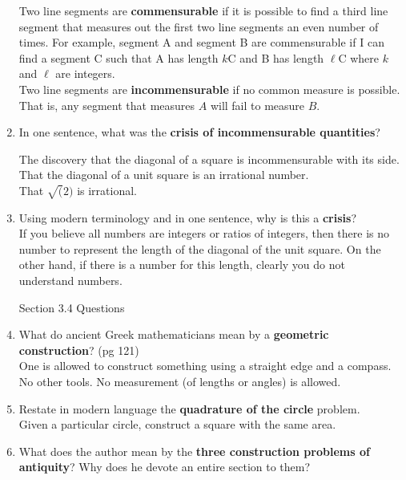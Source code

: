 \documentclass[12pt]{article}
\renewcommand{\emph}[1]{\textsf{\textbf{#1}}}
\begin{document}
\begin{enumerate}
Two line segments are \emph{commensurable} if it is possible to find a third line segment that measures out the first two line segments an even number of times. For example, segment A and segment B are commensurable if I can find a segment C such that A has length $k$C and B has length $\ell$C where $k$ and $\ell$ are integers.\\

Two line segments are \emph{incommensurable} if no common measure is possible. That is, any segment that measures $A$ will fail to measure $B.$\\

\item In one sentence, what was the \emph{crisis of incommensurable quantities}? 

The discovery that the diagonal of a square is incommensurable with its side.\\
That the diagonal of a unit square is an irrational number.\\
That $\sqrt(2)$ is irrational.\\

\item Using modern terminology and in one sentence, why is this a \emph{crisis}?\\

If you believe all numbers are integers or ratios of integers, then there is no number to represent the length of the diagonal of the unit square. On the other hand, if there is a number for this length, clearly you do not understand numbers.\\

\begin{center} Section 3.4 Questions \end{center}

\item What do ancient Greek mathematicians mean by a \emph{geometric construction}? (pg 121)\\
One is allowed to construct something using a straight edge and a compass. No other tools. No measurement (of lengths or angles) is allowed.
\item Restate in modern language the \emph{quadrature of the circle} problem.\\
Given a particular circle, construct a square with the same area. 
\item What does the author mean by the \emph{three construction problems of antiquity}? Why does he devote an entire section to them?\\


\end{enumerate}
\end{document}

